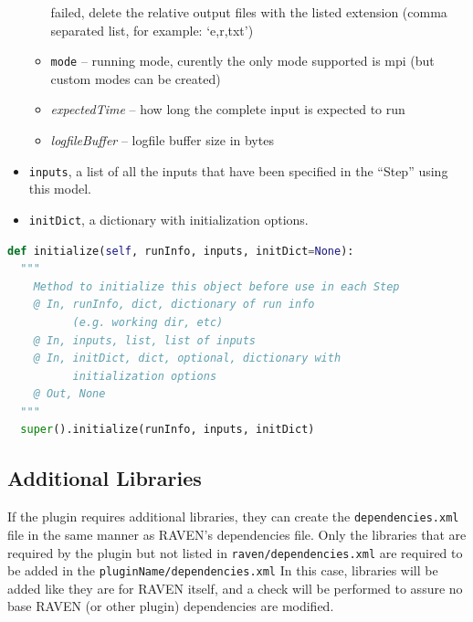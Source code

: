 \begin{itemize}
\begin{itemize}
    failed, delete the relative output files with the listed extension (comma
    separated list, for example: `e,r,txt')
    \item \texttt{mode} -- running mode, curently the only mode supported is
      mpi (but custom modes can be created)
    \item \textit{expectedTime} -- how long the complete input is expected to
    run
    \item \textit{logfileBuffer} -- logfile buffer size in bytes
  \end{itemize}
  \item \texttt{inputs}, a list of all the inputs that have been specified in the
  ``Step'' using this model.
  \item \texttt{initDict}, a dictionary with initialization options.
\end{itemize}

\begin{lstlisting}[language=python]
def initialize(self, runInfo, inputs, initDict=None):
  """
    Method to initialize this object before use in each Step
    @ In, runInfo, dict, dictionary of run info
          (e.g. working dir, etc)
    @ In, inputs, list, list of inputs
    @ In, initDict, dict, optional, dictionary with
          initialization options
    @ Out, None
  """
  super().initialize(runInfo, inputs, initDict)
\end{lstlisting}


\subsection{Additional Libraries}
If the plugin requires additional libraries, they can create the \texttt{dependencies.xml} file in
the same manner as RAVEN's dependencies file. Only the libraries that are required by
the plugin but not listed in \texttt{raven/dependencies.xml} are required to be added in the \texttt{pluginName/dependencies.xml}
In this case, libraries will be added like they are for RAVEN
itself, and a check will be performed to assure no base RAVEN (or other plugin) dependencies are
modified.

